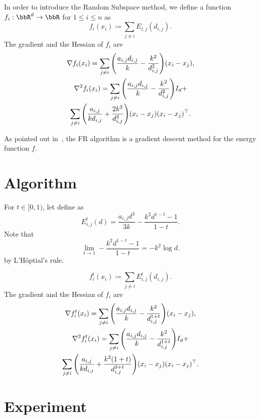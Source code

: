 \documentclass[journal]{IEEEtran}
\newcommand{\defeq}{\coloneqq}
\newcommand{\Lhopital}{L'H\^optial}
\begin{document}
In order to introduce the Random Subspace method, we define a function $f_i: \bbR^{d} \to \bbR$ for $1 \leq i \leq n$ as
\begin{equation*}
  f_i(x_i) \defeq \sum_{j \neq i} E_{i,j}(d_{i,j}).
\end{equation*}
The gradient and the Hessian of $f_i$ are
\begin{gather*}
  \nabla f_i(x_i) = \sum_{j \neq i} \qty(\frac{a_{i,j}d_{i,j}}{k} - \frac{k^2}{d_{i,j}^2}) (x_i-x_j), \\
  \nabla^2 f_i(x_i) = \sum_{j \neq i} \qty(\frac{a_{i,j}d_{i,j}}{k} - \frac{k^2}{d_{i,j}^2}) I_d +      \\
  \sum_{j \neq i} \qty(\frac{a_{i,j}}{k d_{i,j}} + \frac{2k^2}{d_{i,j}^4}) (x_i - x_j)(x_i - x_j)^\top.
\end{gather*}

As pointed out in~\cite{tunkelang1999numerical},
the FR algorithm is a gradient descent method for the energy function $f$.

\section{Algorithm} \label{sec:algorithm}

For $t \in [0,1)$, let define as
\begin{equation*}
  E_{i,j}^t(d) = \frac{a_{i,j} d^3}{3k} - \frac{k^2 d^{1-t} - 1}{1-t}.
\end{equation*}
Note that
\begin{equation*}
  \lim_{t \to 1} - \frac{k^2 d^{1-t} - 1}{1-t} = -k^2 \log{d}.
\end{equation*}
by \Lhopital's rule.

\begin{equation*}
  f_i^t(x_i) \defeq \sum_{j \neq i} E_{i,j}^t(d_{i,j}).
\end{equation*}
The gradient and the Hessian of $f_i$ are
\begin{gather*}
  \nabla f_i^t(x_i) = \sum_{j \neq i} \qty(\frac{a_{i,j}d_{i,j}}{k} - \frac{k^2}{d_{i,j}^{1+t}}) (x_i-x_j), \\
  \nabla^2 f_i^t(x_i) = \sum_{j \neq i} \qty(\frac{a_{i,j}d_{i,j}}{k} - \frac{k^2}{d_{i,j}^{1+t}}) I_d +      \\
  \sum_{j \neq i} \qty(\frac{a_{i,j}}{k d_{i,j}} + \frac{k^2(1+t)}{d_{i,j}^{3+t}}) (x_i - x_j)(x_i - x_j)^\top.
\end{gather*}


\section{Experiment} \label{sec:experiment}
\end{document}
